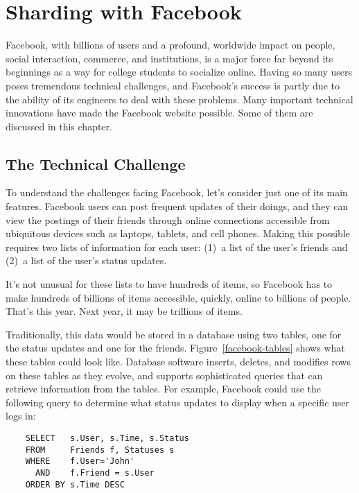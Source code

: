 \chapter{Sharding with Facebook}

Facebook,
with billions of users and a profound, worldwide impact
on people, social interaction, commerce, and institutions,
is a major force far beyond its beginnings
as a way for college students to socialize online.
Having so many users poses tremendous technical challenges,
and Facebook's success is partly due to
the ability of its engineers to deal with these problems.
Many important technical innovations
have made the Facebook website possible.
Some of them are discussed in this chapter.

\section{The Technical Challenge}

To understand the challenges facing Facebook,
let's consider just one of its main features.
Facebook users can post frequent updates of their doings,
and they can view the postings of their friends through online connections
accessible from ubiquitous devices such as laptops, tablets, and cell phones.
Making this possible requires two lists of information for each user:
(1)~a list of the user's friends and
(2)~a list of the user's status updates.

It's not unusual for these lists to have hundreds of items,
so Facebook has to make hundreds of billions of items
accessible, quickly, online to billions of people.
That's this year. Next year, it may be trillions of items.

Traditionally, this data would be stored in a database
using two tables, one for the status updates
and one for the friends.  Figure~\ref{facebook-tables}
shows what these tables could look like.
Database software inserts, deletes, and modifies
rows on these tables as they evolve,
and supports sophisticated queries that can
retrieve information from the tables.
For example, Facebook could use the following query to determine
what status updates to display when a specific user logs in:
\begin{code}
\begin{verbatim}
	SELECT   s.User, s.Time, s.Status
	FROM     Friends f, Statuses s
	WHERE    f.User='John'
	  AND    f.Friend = s.User
	ORDER BY s.Time DESC
\end{verbatim}
\end{code}

